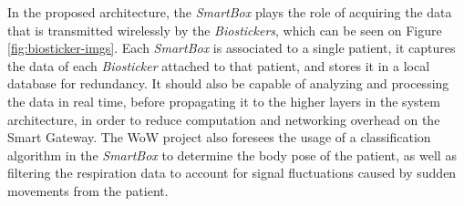 
In the proposed architecture, the \textit{SmartBox} plays the role of acquiring the data that is transmitted wirelessly by the \textit{Biostickers}, which can be seen on Figure \ref{fig:biosticker-imgs}.
Each \textit{SmartBox} is associated to a single patient, it captures the data of each \textit{Biosticker} attached to that patient, and stores it in a local database for redundancy. 
It should also be capable of analyzing and processing the data in real time, before propagating it to the higher layers in the system architecture, in order to reduce computation and networking overhead on the Smart Gateway. The \acs{WoW} project also foresees the usage of a classification algorithm in the \textit{SmartBox} to determine the body pose of the patient, as well as filtering the respiration data to account for signal fluctuations caused by sudden movements from the patient.  

